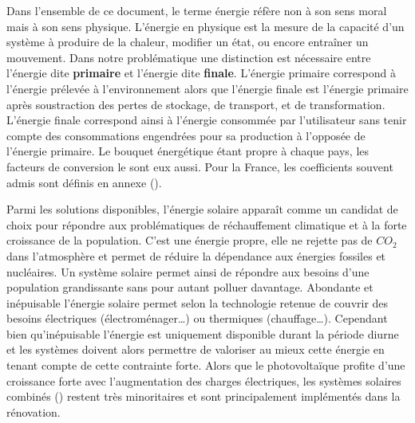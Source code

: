 \begin{Def}[Énergie]\label{def:energie}
Dans l’ensemble de ce document, le terme énergie réfère non à son sens moral mais à son
sens physique. L’énergie en physique est la mesure de la capacité d’un système à produire
de la chaleur, modifier un état, ou encore entraîner un mouvement. Dans notre
problématique une distinction est nécessaire entre l’énergie dite \textbf{primaire} et
l’énergie dite \textbf{finale}. L’énergie primaire correspond à l’énergie prélevée à
l’environnement alors que l’énergie finale est l’énergie primaire après soustraction des
pertes de stockage, de transport, et de transformation. L’énergie finale correspond ainsi
à l’énergie consommée par l’utilisateur sans tenir compte des consommations engendrées pour sa
production à l’opposée de l’énergie primaire. Le bouquet énergétique étant propre à chaque
pays, les facteurs de conversion le sont eux aussi. Pour la France,
les coefficients souvent admis sont définis en annexe ().
\end{Def}

Parmi les solutions disponibles, l’énergie solaire apparaît comme un candidat de choix
pour répondre aux problématiques de réchauffement climatique et à la forte croissance de la
population. C’est une énergie propre, elle ne rejette pas de $CO_{2}$ dans
l’atmosphère et permet de réduire la dépendance aux énergies fossiles et nucléaires. Un
système solaire permet ainsi de répondre aux besoins d’une population grandissante sans
pour autant polluer davantage. Abondante et inépuisable l’énergie solaire permet selon la
technologie retenue de couvrir des besoins électriques (électroménager\dots) ou thermiques
(chauffage\dots). Cependant bien qu’inépuisable l’énergie est uniquement disponible durant
la période diurne et les systèmes doivent alors permettre de valoriser au mieux cette
énergie en tenant compte de cette contrainte forte. Alors que le photovoltaïque profite
d’une croissance forte avec l’augmentation des charges électriques, les systèmes solaires
combinés () restent très minoritaires et sont principalement implémentés dans la
rénovation.

